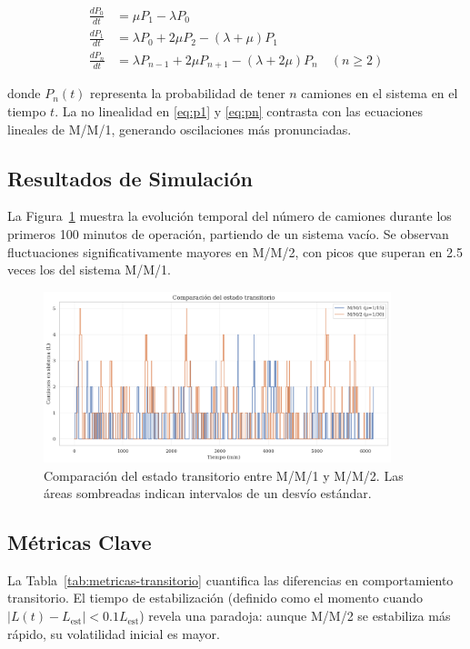 \documentclass[12pt, a4paper]{article}
\begin{document}
    \begin{align}
    	\frac{dP_0}{dt} &= \mu P_1 - \lambda P_0 \label{eq:p0} \\
    	\frac{dP_1}{dt} &= \lambda P_0 + 2\mu P_2 - (\lambda + \mu)P_1 \label{eq:p1} \\
    	\frac{dP_n}{dt} &= \lambda P_{n-1} + 2\mu P_{n+1} - (\lambda + 2\mu)P_n \quad (n \geq 2) \label{eq:pn}
    \end{align}
    
    donde $P_n(t)$ representa la probabilidad de tener $n$ camiones en el sistema en el tiempo $t$. La no linealidad en \eqref{eq:p1} y \eqref{eq:pn} contrasta con las ecuaciones lineales de M/M/1, generando oscilaciones más pronunciadas.
    
    \subsection{Resultados de Simulación}
    La Figura~\ref{fig:transitorio} muestra la evolución temporal del número de camiones durante los primeros 100 minutos de operación, partiendo de un sistema vacío. Se observan fluctuaciones significativamente mayores en M/M/2, con picos que superan en 2.5 veces los del sistema M/M/1.
    
    \begin{figure}[h]
    	\centering
    	\includegraphics[width=0.9\textwidth]{figures/hipotesis5_transitorio.png}
    	\caption{Comparación del estado transitorio entre M/M/1 y M/M/2. Las áreas sombreadas indican intervalos de un desvío estándar.}
    	\label{fig:transitorio}
    \end{figure}
    
    \subsection{Métricas Clave}
    La Tabla~\ref{tab:metricas-transitorio} cuantifica las diferencias en comportamiento transitorio. El tiempo de estabilización (definido como el momento cuando $|L(t) - L_{\text{est}}| < 0.1L_{\text{est}}$) revela una paradoja: aunque M/M/2 se estabiliza más rápido, su volatilidad inicial es mayor.
    
\end{document}
